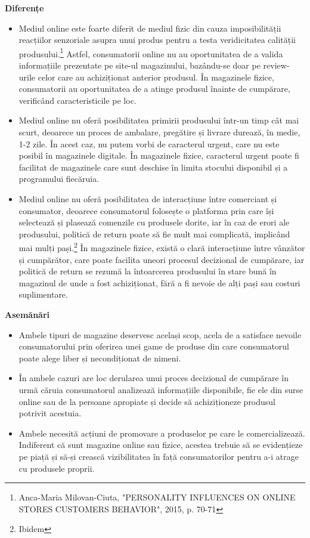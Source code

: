 \documentclass[a4paper, 12pt]{article}
\begin{document}
	\quad \textbf{Diferențe}
	\begin{itemize}
		\item Mediul online este foarte diferit  de mediul fizic din cauza imposibilității reacțiilor senzoriale asupra unui produs pentru a testa veridicitatea calității produsului.\footnote{Anca-Maria Milovan-Ciuta, "PERSONALITY INFLUENCES ON ONLINE STORES CUSTOMERS BEHAVIOR", 2015, p. 70-71} Astfel, consumatorii online nu au oportunitatea de a valida informațiile prezentate pe site-ul magazinului, bazându-se doar pe review-urile celor care au achiziționat anterior produsul. În magazinele fizice, consumatorii au oportunitatea de a atinge produsul înainte de cumpărare, verificând caracteristicile pe loc.
		\item Mediul online nu oferă posibilitatea primirii produsului într-un timp cât mai scurt, deoarece un proces de ambalare, pregătire și livrare durează, în medie, 1-2 zile. În acest caz, nu putem vorbi de caracterul urgent, care nu este posibil în magazinele digitale. În magazinele fizice, caracterul urgent poate fi facilitat de magazinele care sunt deschise în limita stocului disponibil și a programului fiecăruia.
		\item Mediul online nu oferă posibilitatea de interacțiune între comerciant și consumator, deoarece consumatorul folosește o platforma prin care își selectează și plasează comenzile cu produsele dorite, iar în caz de erori ale produsului, politică de return poate să fie mult mai complicată, implicând mai mulți pași.\footnote{Ibidem} În magazinele fizice, există o clară interacțiune între vânzător și cumpărător, care poate facilita uneori procesul decizional de cumpărare, iar politică de return se rezumă la întoarcerea produsului în stare bună în magazinul de unde a fost achiziționat, fără a fi nevoie de alți pași sau costuri suplimentare.
	\end{itemize}
	\quad \textbf{Asemănări}
	\begin{itemize}
		\item Ambele tipuri de magazine deservesc același scop, acela de a satisface nevoile consumatorului prin oferirea unei game de produse din care consumatorul poate alege liber și necondiționat de nimeni.
		\item În ambele cazuri are loc derularea unui proces decizional de cumpărare în urmă căruia consumatorul analizează informațiile disponibile, fie ele din surse online sau de la persoane apropiate și decide să achiziționeze produsul potrivit acestuia. 
		\item Ambele necesită acțiuni de promovare a produselor pe care le comercializează. Indiferent că sunt magazine online sau fizice, acestea trebuie să se evidențieze pe piață și să-și crească vizibilitatea în față consumatorilor pentru a-i atrage cu produsele proprii.
	\end{itemize}
	
\end{document}
